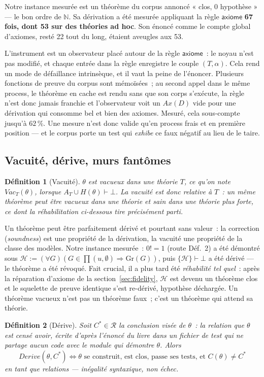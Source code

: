 \documentclass[11pt]{article}
\newtheorem{definition}{Définition}
\theoremstyle{remark}\newtheorem{example}{Exemple}
\begin{document}
Notre instance mesurée est un théorème du corpus annoncé « clos, 0 hypothèse » --- le
bon ordre de $\mathbb{N}$. Sa dérivation a été mesurée appliquant la règle
$\mathsf{axiome}$ \textbf{67 fois, dont 53 sur des théories ad hoc}. Son énoncé comme
le compte global d'axiomes, resté 22 tout du long, étaient aveugles aux 53.

L'instrument est un observateur placé autour de la règle $\mathsf{axiome}$~: le noyau
n'est pas modifié, et chaque entrée dans la règle enregistre le couple
$(T, \alpha)$. Cela rend un mode de défaillance intrinsèque, et il vaut la peine de
l'énoncer. Plusieurs fonctions de preuve du corpus sont mémoïsées~; au second appel
dans le même process, le théorème en cache est rendu sans que son corps s'exécute, la
règle n'est donc jamais franchie et l'observateur voit un $Ax(D)$ vide pour une
dérivation qui consomme bel et bien des axiomes. Mesuré, cela sous-compte jusqu'à
$62\,\%$. Une mesure n'est donc valide qu'en process frais et en première position ---
et le corpus porte un test qui \emph{exhibe} ce faux négatif au lieu de le taire.

\subsection{Vacuité, dérive, murs fantômes}
\begin{definition}[Vacuité] $\theta$ est \emph{vacueux dans} une théorie $T$, ce qu'on
note $\mathit{Vac}_T(\theta)$, lorsque $A_T \cup H(\theta) \vdash \bot$. La vacuité est
donc relative à $T$~: un même théorème peut être vacueux dans une théorie et sain dans
une théorie plus forte, ce dont la réhabilitation ci-dessous tire précisément parti.
\end{definition}
Un théorème peut être parfaitement dérivé et pourtant sans valeur~: la correction
(\emph{soundness}) est une propriété de la dérivation, la vacuité une propriété de la
classe des modèles. Notre instance mesurée~: $0! = 1$ (route Déf.~2) a été démontré
sous $\mathcal{H} := (\forall G)(G \in \prod(u,\emptyset) \Rightarrow
\mathrm{Gr}(G))$, puis $\{\mathcal{H}\} \vdash \bot$ a été dérivé --- le théorème a été
révoqué. Fait crucial, il a plus tard été \emph{réhabilité tel quel}~: après la
réparation d'axiome de la section~\ref{sec:fidelity}, $\mathcal{H}$ est devenu un
théorème clos et le squelette de preuve identique s'est re-dérivé, hypothèse déchargée.
Un théorème vacueux n'est pas un théorème faux~; c'est un théorème qui attend sa
théorie.

\begin{definition}[Dérive]
Soit $C^\ast \in \mathcal{R}$ la \emph{conclusion visée} de $\theta$~: la relation que
$\theta$ est censé avoir, écrite d'après l'énoncé du livre dans un fichier de test qui
ne partage aucun code avec le module qui démontre $\theta$. Alors
\[ \mathit{Derive}(\theta, C^\ast) \iff \theta \text{ se construit, est clos, passe
   ses tests, et } C(\theta) \neq C^\ast \]
en tant que relations --- inégalité syntaxique, non échec.
\end{definition}
\end{document}
